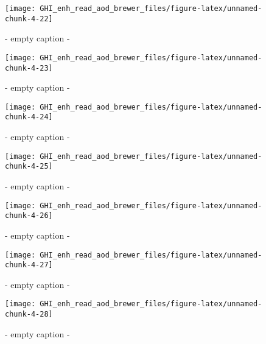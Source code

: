 \documentclass[
  10pt,
  a4paper,oneside]{article}
\begin{document}
\begin{figure}[H]

{\centering \texttt{[image: GHI\_enh\_read\_aod\_brewer\_files/figure-latex/unnamed-chunk-4-22]} 

}

\caption{ - empty caption - }\label{fig:unnamed-chunk-4-22}
\end{figure}
\begin{figure}[H]

{\centering \texttt{[image: GHI\_enh\_read\_aod\_brewer\_files/figure-latex/unnamed-chunk-4-23]} 

}

\caption{ - empty caption - }\label{fig:unnamed-chunk-4-23}
\end{figure}
\begin{figure}[H]

{\centering \texttt{[image: GHI\_enh\_read\_aod\_brewer\_files/figure-latex/unnamed-chunk-4-24]} 

}

\caption{ - empty caption - }\label{fig:unnamed-chunk-4-24}
\end{figure}
\begin{figure}[H]

{\centering \texttt{[image: GHI\_enh\_read\_aod\_brewer\_files/figure-latex/unnamed-chunk-4-25]} 

}

\caption{ - empty caption - }\label{fig:unnamed-chunk-4-25}
\end{figure}
\begin{figure}[H]

{\centering \texttt{[image: GHI\_enh\_read\_aod\_brewer\_files/figure-latex/unnamed-chunk-4-26]} 

}

\caption{ - empty caption - }\label{fig:unnamed-chunk-4-26}
\end{figure}
\begin{figure}[H]

{\centering \texttt{[image: GHI\_enh\_read\_aod\_brewer\_files/figure-latex/unnamed-chunk-4-27]} 

}

\caption{ - empty caption - }\label{fig:unnamed-chunk-4-27}
\end{figure}
\begin{figure}[H]

{\centering \texttt{[image: GHI\_enh\_read\_aod\_brewer\_files/figure-latex/unnamed-chunk-4-28]} 

}

\caption{ - empty caption - }\label{fig:unnamed-chunk-4-28}
\end{figure}
\end{document}
